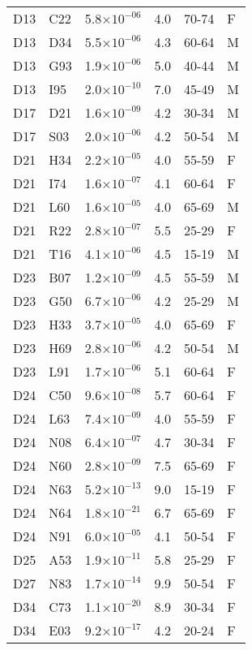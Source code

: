 \begin{longtable}{lllrll}
   D13 & C22 & 5.8$\times10^{-06}$ & 4.0 & 70-74 & F \\ 
   D13 & D34 & 5.5$\times10^{-06}$ & 4.3 & 60-64 & M \\ 
   D13 & G93 & 1.9$\times10^{-06}$ & 5.0 & 40-44 & M \\ 
   D13 & I95 & 2.0$\times10^{-10}$ & 7.0 & 45-49 & M \\ 
   D17 & D21 & 1.6$\times10^{-09}$ & 4.2 & 30-34 & M \\ 
   D17 & S03 & 2.0$\times10^{-06}$ & 4.2 & 50-54 & M \\ 
   D21 & H34 & 2.2$\times10^{-05}$ & 4.0 & 55-59 & F \\ 
   D21 & I74 & 1.6$\times10^{-07}$ & 4.1 & 60-64 & F \\ 
   D21 & L60 & 1.6$\times10^{-05}$ & 4.0 & 65-69 & M \\ 
   D21 & R22 & 2.8$\times10^{-07}$ & 5.5 & 25-29 & F \\ 
   D21 & T16 & 4.1$\times10^{-06}$ & 4.5 & 15-19 & M \\ 
   D23 & B07 & 1.2$\times10^{-09}$ & 4.5 & 55-59 & M \\ 
   D23 & G50 & 6.7$\times10^{-06}$ & 4.2 & 25-29 & M \\ 
   D23 & H33 & 3.7$\times10^{-05}$ & 4.0 & 65-69 & F \\ 
   D23 & H69 & 2.8$\times10^{-06}$ & 4.2 & 50-54 & M \\ 
   D23 & L91 & 1.7$\times10^{-06}$ & 5.1 & 60-64 & F \\ 
   D24 & C50 & 9.6$\times10^{-08}$ & 5.7 & 60-64 & F \\ 
   D24 & L63 & 7.4$\times10^{-09}$ & 4.0 & 55-59 & F \\ 
   D24 & N08 & 6.4$\times10^{-07}$ & 4.7 & 30-34 & F \\ 
   D24 & N60 & 2.8$\times10^{-09}$ & 7.5 & 65-69 & F \\ 
   D24 & N63 & 5.2$\times10^{-13}$ & 9.0 & 15-19 & F \\ 
   D24 & N64 & 1.8$\times10^{-21}$ & 6.7 & 65-69 & F \\ 
   D24 & N91 & 6.0$\times10^{-05}$ & 4.1 & 50-54 & F \\ 
   D25 & A53 & 1.9$\times10^{-11}$ & 5.8 & 25-29 & F \\ 
   D27 & N83 & 1.7$\times10^{-14}$ & 9.9 & 50-54 & F \\ 
   D34 & C73 & 1.1$\times10^{-20}$ & 8.9 & 30-34 & F \\ 
   D34 & E03 & 9.2$\times10^{-17}$ & 4.2 & 20-24 & F \\ 

\end{longtable}
